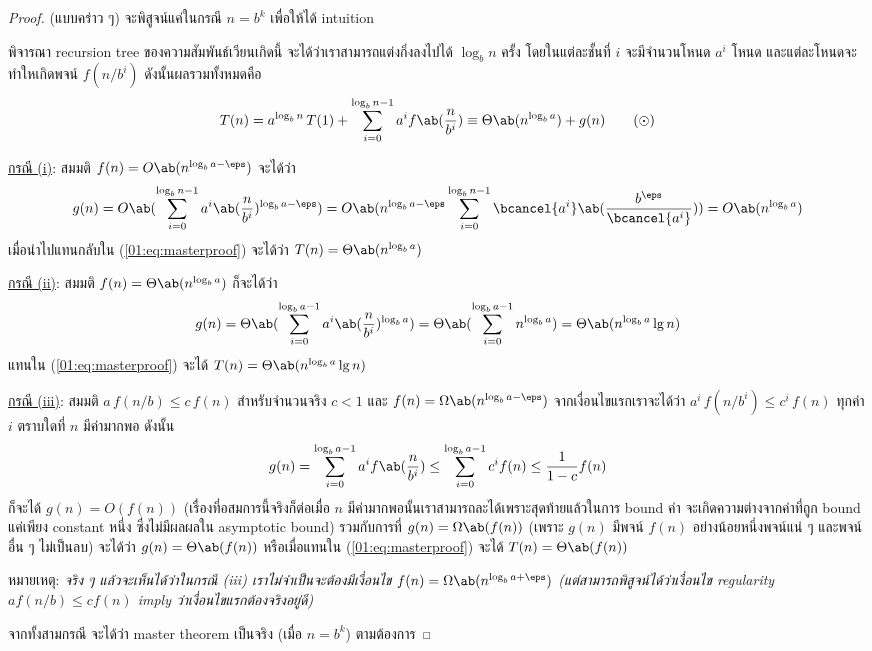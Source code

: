 \begin{proof}
	(แบบคร่าว ๆ) จะพิสูจน์แค่ในกรณี $n = b^k$ เพื่อให้ได้ intuition
	
	พิจารณา recursion tree ของความสัมพันธ์เวียนเกิดนี้ จะได้ว่าเราสามารถแต่งกิ่งลงไปได้ $\log_b n$ ครั้ง โดยในแต่ละชั้นที่ $i$ จะมีจำนวนโหนด $a^i$ โหนด และแต่ละโหนดจะทำใหเกิดพจน์ $f(n/b^i)$ ดังนั้นผลรวมทั้งหมดคือ
	\begin{equation}
		T(n) = a^{\log_b n}\,T(1) + \sum_{i=0}^{\log_b n - 1} a^i f\ab(\frac{n}{b^i}) \equiv \Theta\ab(n^{\log_b a}) + g(n)\tag{$\odot$}\label{01:eq:masterproof}
	\end{equation}

	\underline{กรณี (i)}: สมมติ $f(n) = O\ab(n^{\log_b a - \eps})$ จะได้ว่า
	\[
		g(n) = O\ab(\sum_{i=0}^{\log_b n - 1} a^i \ab(\frac{n}{b^i})^{\log_b a -\eps}) = O\ab(n^{\log_b a -\eps}\sum_{i=0}^{\log_bn-1}\bcancel{a^i}\ab(\frac{b^\eps}{\bcancel{a^i}})) = O\ab(n^{\log_b a})
	\]
	เมื่อนำไปแทนกลับใน (\ref{01:eq:masterproof}) จะได้ว่า $T(n) = \Theta\ab(n^{\log_ba})$

	\underline{กรณี (ii)}: สมมติ $f(n) = \Theta\ab(n^{\log_b a})$ ก็จะได้ว่า
	\[
		g(n) = \Theta\ab(\sum_{i=0}^{\log_ba-1}a^i\ab(\frac{n}{b^i})^{\log_ba}) = \Theta\ab(\sum_{i=0}^{\log_ba-1}n^{\log_ba}) = \Theta\ab(n^{\log_ba}\lg n)
	\]
	แทนใน (\ref{01:eq:masterproof}) จะได้ $T(n) = \Theta\ab(n^{\log_ba}\lg n)$

	\underline{กรณี (iii)}: สมมติ $a\,f(n/b) \leq c\,f(n)$ สำหรับจำนวนจริง $c < 1$ และ $f(n) = \Omega\ab(n^{\log_b a - \eps})$ จากเงื่อนไขแรกเราจะได้ว่า $a^i\,f(n/b^i) \leq c^i\,f(n)$ ทุกค่า $i$ ตราบใดที่ $n$ มีค่ามากพอ ดังนั้น
	\[
		g(n) = \sum_{i=0}^{\log_ba-1}a^if\ab(\frac{n}{b^i}) \leq \sum_{i=0}^{\log_ba-1}c^if(n) \leq \frac{1}{1-c}f(n)
	\]
	ก็จะได้ $g(n) = O(f(n))$ (เรื่องที่อสมการนี้จริงก็ต่อเมื่อ $n$ มีค่ามากพอนั้นเราสามารถละได้เพราะสุดท้ายแล้วในการ bound ค่า จะเกิดความต่างจากค่าที่ถูก bound แค่เพียง constant หนึ่ง ซึ่งไม่มีผลผลใน asymptotic bound) รวมกับการที่ $g(n) = \Omega\ab(f(n))$ (เพราะ $g(n)$ มีพจน์ $f(n)$ อย่างน้อยหนึ่งพจน์แน่ ๆ และพจน์อื่น ๆ ไม่เป็นลบ) จะได้ว่า $g(n) = \Theta\ab(f(n))$ หรือเมื่อแทนใน (\ref{01:eq:masterproof}) จะได้ $T(n) = \Theta\ab(f(n))$

	หมายเหตุ: \emph{จริง ๆ แล้วจะเห็นได้ว่าในกรณี (iii) เราไม่จำเป็นจะต้องมีเงื่อนไข $f(n) = \Omega\ab(n^{\log_b a + \eps})$ (แต่สามารถพิสูจน์ได้ว่าเงื่อนไข regularity $af(n/b) \leq cf(n)$ imply ว่าเงื่อนไขแรกต้องจริงอยู่ดี)}

	จากทั้งสามกรณี จะได้ว่า master theorem เป็นจริง (เมื่อ $n = b^k$) ตามต้องการ
\end{proof}